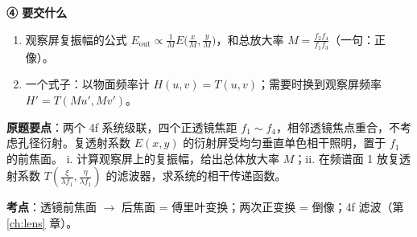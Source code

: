 \begin{idea}[读题：这道题在说什么]
\textbf{④ 要交什么}
\begin{enumerate}[label=\roman*.]
\item 观察屏复振幅的公式 $E_{\text{out}}\propto\frac1M E\big(\frac xM,\frac yM\big)$，和总放大率 $M=\frac{f_2f_4}{f_1f_3}$（一句：正像）。
\item 一个式子：以物面频率计 $H(u,v)=T(u,v)$；需要时换到观察屏频率 $H'=T(Mu',Mv')$。
\end{enumerate}
\end{idea}

\noindent\textbf{原题要点}：两个 4f 系统级联，四个正透镜焦距 $f_1\sim f_4$，相邻透镜焦点重合，不考虑孔径衍射。复透射系数 $E(x,y)$ 的衍射屏受均匀垂直单色相干照明，置于 $f_1$ 的前焦面。
i. 计算观察屏上的复振幅，给出总体放大率 $M$；ii. 在频谱面 1 放复透射系数 $T\!\left(\frac{\xi}{\lambda f_1},\frac{\eta}{\lambda f_1}\right)$ 的滤波器，求系统的相干传递函数。

\textbf{考点}：透镜前焦面 $\to$ 后焦面 = 傅里叶变换；两次正变换 = 倒像；4f 滤波（第 \ref{ch:lens} 章）。

